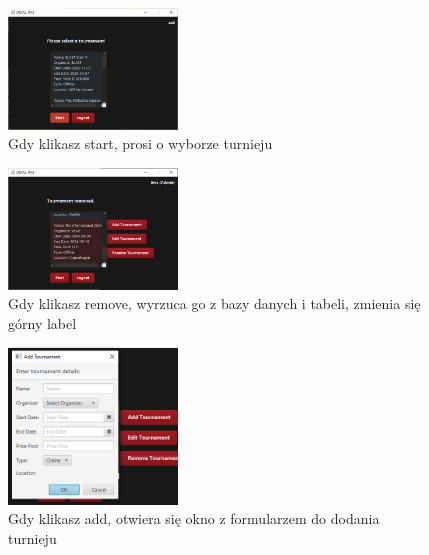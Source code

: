 \begin{figure}
    \centering
    \includegraphics[width=0.4\textwidth]{figures/IfPressStart.png}
    \caption{Gdy klikasz start, prosi o wyborze turnieju \label{fig:tournament_selection_fxml_admin}}
\end{figure}
\begin{figure}[H]
    \centering
    \includegraphics[width=0.4\textwidth]{figures/Removing.png}
    \caption{Gdy klikasz remove, wyrzuca go z bazy danych i tabeli, zmienia się górny label \label{fig:tournament_selection_fxml_remove}}
\end{figure}
\begin{figure}
    \centering
    \includegraphics[width=0.4\textwidth]{figures/Add.png}
    \caption{Gdy klikasz add, otwiera się okno z formularzem do dodania turnieju \label{fig:tournament_selection_fxml_add}}
\end{figure}
